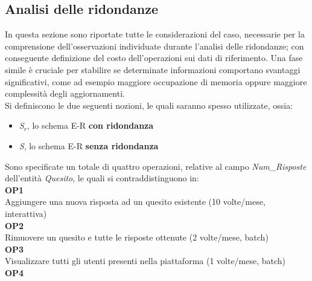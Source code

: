 \documentclass{article}
\begin{document}
\subsection{Analisi delle ridondanze}
\large
In questa sezione sono riportate tutte le considerazioni del caso, necessarie per la comprensione dell'osservazioni individuate durante l'analisi delle ridondanze; con conseguente definizione del costo dell'operazioni sui dati di riferimento. Una fase simile è cruciale per stabilire se determinate informazioni comportano svantaggi significativi, come ad esempio maggiore occupazione di memoria oppure maggiore complessità degli aggiornamenti.\vspace{7pt}\\
Si definiscono le due seguenti nozioni, le quali saranno spesso utilizzate, ossia:
\begin{itemize}[label={ }]
    \itemsep0em
    \item \textit{S$_r$}, lo schema E-R \textbf{con ridondanza}
    \item \textit{S}, \hspace{1px} lo schema E-R \textbf{senza ridondanza}
\end{itemize}
\vspace*{7pt}
Sono specificate un totale di quattro operazioni, relative al campo \textit{Num\_Risposte} dell'entità \textit{Quesito}, le quali si contraddistinguono in: \vspace*{7pt}\\
\hspace*{5pt}\textbf{OP1} \\
\hspace*{5pt}Aggiungere una nuova risposta ad un quesito esistente (10 volte/mese, interattiva) \vspace*{7pt}\\
\hspace*{5pt}\textbf{OP2} \\
\hspace*{5pt}Rimuovere un quesito e tutte le risposte ottenute (2 volte/mese, batch) \vspace*{7pt}\\
\hspace*{5pt}\textbf{OP3} \\
\hspace*{5pt}Visualizzare tutti gli utenti presenti nella piattaforma (1 volte/mese, batch) \vspace*{7pt}\\
\hspace*{5pt}\textbf{OP4} \\
\end{document}

